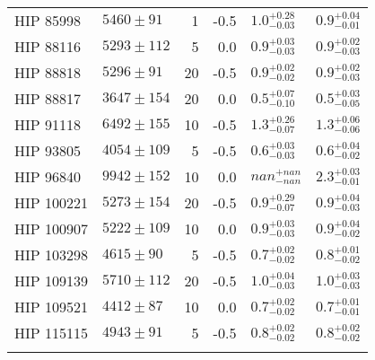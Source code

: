\documentclass{emulateapj}
\begin{document}
\begin{longtable*}{|l|lrrll|}
  HIP 85998 &   $5460 \pm 91$ &       1 &    -0.5 &  $1.0^{+0.28}_{-0.03}$ &  $0.9^{+0.04}_{-0.01}$ \\
  HIP 88116 &  $5293 \pm 112$ &       5 &     0.0 &  $0.9^{+0.03}_{-0.03}$ &  $0.9^{+0.02}_{-0.03}$ \\
  HIP 88818 &   $5296 \pm 91$ &      20 &    -0.5 &  $0.9^{+0.02}_{-0.02}$ &  $0.9^{+0.02}_{-0.03}$ \\
  HIP 88817 &  $3647 \pm 154$ &      20 &     0.0 &  $0.5^{+0.07}_{-0.10}$ &  $0.5^{+0.03}_{-0.05}$ \\
  HIP 91118 &  $6492 \pm 155$ &      10 &    -0.5 &  $1.3^{+0.26}_{-0.07}$ &  $1.3^{+0.06}_{-0.06}$ \\
  HIP 93805 &  $4054 \pm 109$ &       5 &    -0.5 &  $0.6^{+0.03}_{-0.03}$ &  $0.6^{+0.04}_{-0.02}$ \\
  HIP 96840 &  $9942 \pm 152$ &      10 &     0.0 &    $nan^{+nan}_{-nan}$ &  $2.3^{+0.03}_{-0.01}$ \\
 HIP 100221 &  $5273 \pm 154$ &      20 &    -0.5 &  $0.9^{+0.29}_{-0.07}$ &  $0.9^{+0.04}_{-0.03}$ \\
 HIP 100907 &  $5222 \pm 109$ &      10 &     0.0 &  $0.9^{+0.03}_{-0.03}$ &  $0.9^{+0.04}_{-0.02}$ \\
 HIP 103298 &   $4615 \pm 90$ &       5 &    -0.5 &  $0.7^{+0.02}_{-0.02}$ &  $0.8^{+0.01}_{-0.02}$ \\
 HIP 109139 &  $5710 \pm 112$ &      20 &    -0.5 &  $1.0^{+0.04}_{-0.03}$ &  $1.0^{+0.03}_{-0.03}$ \\
 HIP 109521 &   $4412 \pm 87$ &      10 &     0.0 &  $0.7^{+0.02}_{-0.02}$ &  $0.7^{+0.01}_{-0.01}$ \\
 HIP 115115 &   $4943 \pm 91$ &       5 &    -0.5 &  $0.8^{+0.02}_{-0.02}$ &  $0.8^{+0.02}_{-0.02}$ \\
 \label{tab:companions}
\end{longtable*}


\newpage
\clearpage

\end{document}
